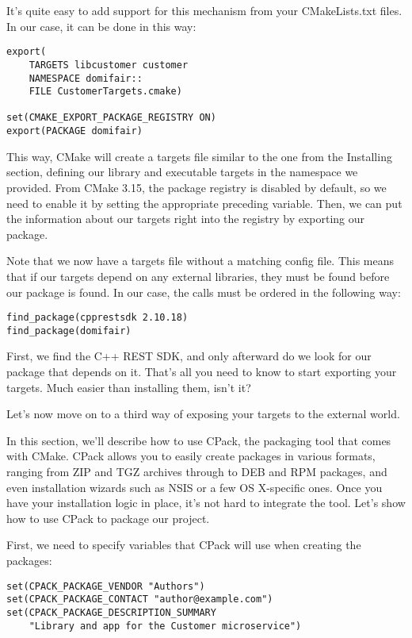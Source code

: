 It's quite easy to add support for this mechanism from your CMakeLists.txt files. In our case, it can be done in this way:

\begin{lstlisting}[style=styleCMake]
export(
	TARGETS libcustomer customer
	NAMESPACE domifair::
	FILE CustomerTargets.cmake)

set(CMAKE_EXPORT_PACKAGE_REGISTRY ON)
export(PACKAGE domifair)
\end{lstlisting}

This way, CMake will create a targets file similar to the one from the Installing section, defining our library and executable targets in the namespace we provided. From CMake 3.15, the package registry is disabled by default, so we need to enable it by setting the appropriate preceding variable. Then, we can put the information about our targets right into the registry by exporting our package.

Note that we now have a targets file without a matching config file. This means that if our targets depend on any external libraries, they must be found before our package is found. In our case, the calls must be ordered in the following way:

\begin{lstlisting}[style=styleCMake]
find_package(cpprestsdk 2.10.18)
find_package(domifair)
\end{lstlisting}

First, we find the C++ REST SDK, and only afterward do we look for our package that depends on it. That's all you need to know to start exporting your targets. Much easier than installing them, isn't it?

Let's now move on to a third way of exposing your targets to the external world.


In this section, we'll describe how to use CPack, the packaging tool that comes with CMake. CPack allows you to easily create packages in various formats, ranging from ZIP and TGZ archives through to DEB and RPM packages, and even installation wizards such as NSIS or a few OS X-specific ones. Once you have your installation logic in place, it's not hard to integrate the tool. Let's show how to use CPack to package our project.

First, we need to specify variables that CPack will use when creating the packages:

\begin{lstlisting}[style=styleCMake]
set(CPACK_PACKAGE_VENDOR "Authors")
set(CPACK_PACKAGE_CONTACT "author@example.com")
set(CPACK_PACKAGE_DESCRIPTION_SUMMARY
	"Library and app for the Customer microservice")
\end{lstlisting}

